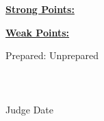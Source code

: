 \vskip 0.5cm 

\underline{\textbf{Strong Points:}}
\newline
\newline
\newline
\newline
\newline

\underline{\textbf{Weak Points:}}
\newline
\newline
\newline
\newline

Prepared:\underline{\hskip1cm}\hskip1cm Unprepared\underline{\hskip1cm} \\\\\\

\underline{\hskip4cm}\hskip4cm\underline{\hskip4cm}\\
\indent\indent\indent\indent Judge \hskip 7cm Date\\

